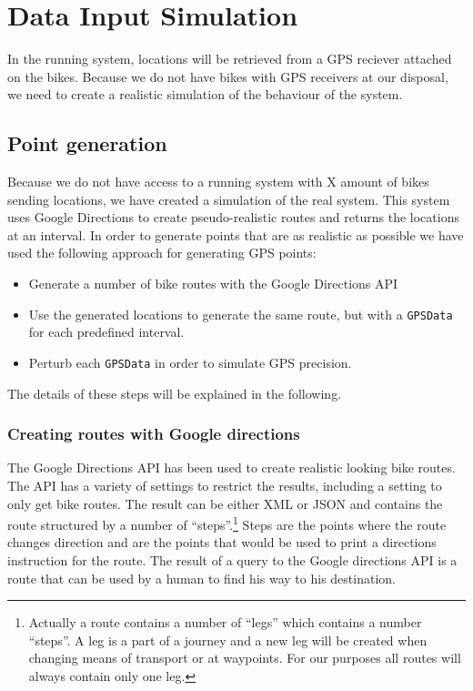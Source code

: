 
\section{Data Input Simulation}\label{design:datasimulation}
In the running system, locations will be retrieved from a GPS reciever attached on the bikes.
Because we do not have bikes with GPS receivers at our disposal, we need to create a realistic simulation of the behaviour of the system.

\subsection{Point generation}
Because we do not have access to a running system with X amount of bikes sending locations, we have created a simulation of the real system.
This system uses Google Directions to create pseudo-realistic routes and returns the locations at an interval.
In order to generate points that are as realistic as possible we have used the following approach for generating GPS points:

\begin{itemize}
\item Generate a number of bike routes with the Google Directions API
\item Use the generated locations to generate the same route, but with a \texttt{GPSData} for each predefined interval.
\item Perturb each \texttt{GPSData} in order to simulate GPS precision.
\end{itemize}

The details of these steps will be explained in the following.

\subsubsection{Creating routes with Google directions}
The Google Directions API \cite{gdirections} has been used to create realistic looking bike routes.
The API has a variety of settings to restrict the results, including a setting to only get bike routes.
The result can be either XML or JSON and contains the route structured by a number of ``steps''.\footnote{Actually a route contains a number of  ``legs'' which contains a number ``steps''. 
A leg is a part of a journey and a new leg will be created when changing means of transport or at waypoints.
For our purposes all routes will always contain only one leg.}
Steps are the points where the route changes direction and are the points that would be used to print a directions instruction for the route.
The result of a query to the Google directions API is a route that can be used by a human to find his way to his destination.

